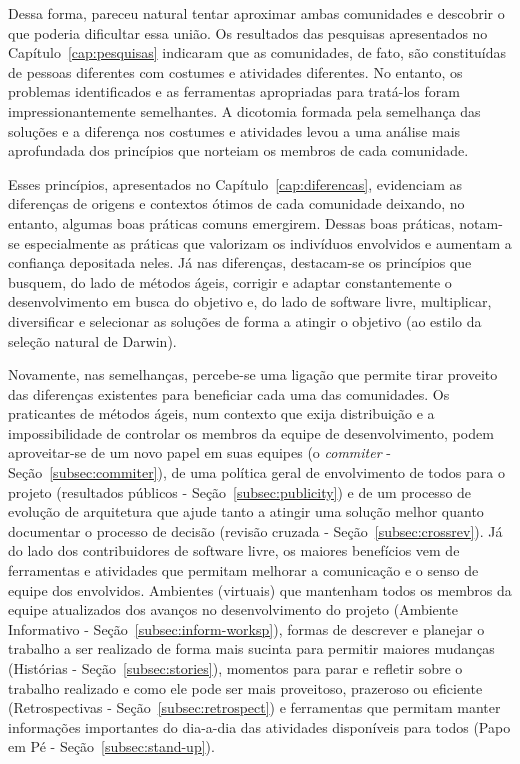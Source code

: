 Dessa forma, pareceu natural tentar aproximar ambas comunidades e
descobrir o que poderia dificultar essa união. Os resultados das
pesquisas apresentados no Capítulo~\ref{cap:pesquisas} indicaram que
as comunidades, de fato, são constituídas de pessoas diferentes com
costumes e atividades diferentes. No entanto, os problemas
identificados e as ferramentas apropriadas para tratá-los foram
impressionantemente semelhantes.  A dicotomia formada pela semelhança
das soluções e a diferença nos costumes e atividades levou a uma
análise mais aprofundada dos princípios que norteiam os membros de
cada comunidade.

Esses princípios, apresentados no Capítulo~\ref{cap:diferencas},
evidenciam as diferenças de origens e contextos ótimos de cada
comunidade deixando, no entanto, algumas boas práticas comuns
emergirem. Dessas boas práticas, notam-se especialmente as práticas
que valorizam os indivíduos envolvidos e aumentam a confiança
depositada neles. Já nas diferenças, destacam-se os princípios que
busquem, do lado de métodos ágeis, corrigir e adaptar constantemente o
desenvolvimento em busca do objetivo e, do lado de software livre,
multiplicar, diversificar e selecionar as soluções de forma a atingir
o objetivo (ao estilo da seleção natural de Darwin).


Novamente, nas semelhanças, percebe-se uma ligação que permite tirar
proveito das diferenças existentes para beneficiar cada uma das
comunidades. Os praticantes de métodos ágeis, num contexto que exija
distribuição e a impossibilidade de controlar os membros da equipe de
desenvolvimento, podem aproveitar-se de um novo papel em suas equipes
(o \emph{commiter} - Seção~\ref{subsec:commiter}), de uma política
geral de envolvimento de todos para o projeto (resultados públicos -
Seção~\ref{subsec:publicity}) e de um processo de evolução de
arquitetura que ajude tanto a atingir uma solução melhor quanto
documentar o processo de decisão (revisão cruzada -
Seção~\ref{subsec:crossrev}).  Já do lado dos contribuidores de
software livre, os maiores benefícios vem de ferramentas e atividades
que permitam melhorar a comunicação e o senso de equipe dos
envolvidos. Ambientes (virtuais) que mantenham todos os membros da
equipe atualizados dos avanços no desenvolvimento do projeto (Ambiente
Informativo - Seção~\ref{subsec:inform-worksp}), formas de descrever e
planejar o trabalho a ser realizado de forma mais sucinta para
permitir maiores mudanças (Histórias - Seção~\ref{subsec:stories}),
momentos para parar e refletir sobre o trabalho realizado e como ele
pode ser mais proveitoso, prazeroso ou eficiente (Retrospectivas -
Seção~\ref{subsec:retrospect}) e ferramentas que permitam manter
informações importantes do dia-a-dia das atividades disponíveis para
todos (Papo em Pé - Seção~\ref{subsec:stand-up}).

